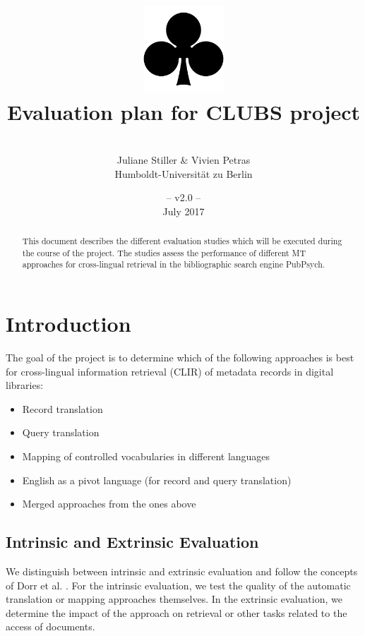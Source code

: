 \documentclass[a4paper,11pt]{article}
\title{
\includegraphics[width=3cm]{./img/200px-SuitClubs.png} \\
\Huge Evaluation plan for CLUBS project \\ 
}
\author{\vspace*{1cm}\\ \LARGE Juliane Stiller \& Vivien Petras \medskip \\ \Large Humboldt-Universit\"at zu Berlin}
\date{\vspace*{2cm} -- v2.0 --\\July 2017}
\begin{document}
\clearpage\maketitle
\thispagestyle{empty}

\vspace*{5cm}
\begin{abstract}
This document describes the different evaluation studies which will be executed during the course of the project. The studies assess the performance of different MT approaches for cross-lingual retrieval in the bibliographic search engine PubPsych.
\end{abstract}

\newpage
\tableofcontents
\clearpage


\section{Introduction}
\label{s:intro}

The goal of the project is to determine which of the following approaches is best for cross-lingual information retrieval (CLIR) of metadata records in digital libraries:
\begin{itemize}
\item Record translation
\item Query translation
\item Mapping of controlled vocabularies in different languages
\item English as a pivot language (for record and query translation)
\item Merged approaches from the ones above
\end{itemize}

\subsection{Intrinsic and Extrinsic Evaluation}
We distinguish between intrinsic and extrinsic evaluation and follow the concepts of Dorr et al. \cite{dorr_machine_2011}. For the intrinsic evaluation, we test the quality of the automatic translation or mapping approaches themselves. In the extrinsic evaluation, we determine the impact of the approach on retrieval or other tasks related to the access of documents.
\end{document}
